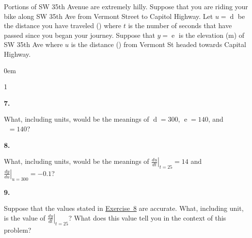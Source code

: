 \documentclass[12pt,]{book}
\theoremstyle{plain}
\theoremstyle{definition}
\numberwithin{equation}{section}
\newenvironment{exercisegroup}%
{\medskip\noindent}%
{\par\bigskip}%
\newlength{\exercisegroupindent}%
\newlength{\exercisegroupitemwidth}%
\newenvironment{exercisegrouplist}%
{\vspace{-\partopsep}%
\begin{adjustwidth}{\exercisegroupindent}{0em}}%
{\end{adjustwidth}%
\vspace{-\partopsep}%
\vspace{\baselineskip}}%
\newenvironment{exercisegroupbycol}[1]%
{\begin{exercisegrouplist}%
\vspace{-\multicolsep}%
\begin{multicols}{#1}%
\setlength{\parindent}{0em}%
\setlength{\exercisegroupitemwidth}{\linewidth}}%
{\end{multicols}%
\vspace{-\multicolsep}%
\end{exercisegrouplist}}%
\newenvironment{exercisegroupitem}[1]%
{\begin{minipage}[t]{\exercisegroupitemwidth}
\vspace{0pt}%
{\bfseries#1}%
\rule{0pt}{\baselineskip}}{\strut%
\end{minipage}%
\hspace{\columnsep}}%
\providecommand\phantomsection{}
\newcommand{\fe}[2]{\mathop{{#1}{\left(#2\right)}}}
\newcommand{\lzoa}[3]{\left.{\frac{d#1}{d#2}}\right|_{#3}}
\begin{document}
\begin{exercisegroup}%
Portions of SW 35th Avenue are extremely hilly.  Suppose that you are riding your bike along SW 35th Ave from Vermont Street to Capitol Highway.  Let \(u=\fe{d}{t}\) be the distance you have traveled (\si{\foot}) where \(t\) is the number of seconds that have passed since you began your journey.  Suppose that \(y=\fe{e}{u}\) is the elevation (\si{\meter}) of SW 35th Ave where \(u\) is the distance (\si{\foot}) from Vermont St headed towards Capital Highway.%
\par
\begin{exercisegroupbycol}{1}%
\begin{exercisegroupitem}{7. }\phantomsection\hypertarget{exercise-371}{\null}
What, including units, would be the meanings of \(\fe{d}{25}=300\), \(\fe{e}{300}=140\), and \(\fe{\left(e\circ d\right)}{25}=140\)?%
\end{exercisegroupitem}%
\par%
\begin{exercisegroupitem}{8. }\phantomsection\hypertarget{exercise-leibniz-chain-rule}{\null}
What, including units, would be the meanings of \(\lzoa{u}{t}{t=25}=14\) and \(\lzoa{y}{u}{u=300}=-0.1\)?%
\end{exercisegroupitem}%
\par%
\begin{exercisegroupitem}{9. }\phantomsection\hypertarget{exercise-373}{\null}
Suppose that the values stated in \hyperref[exercise-leibniz-chain-rule]{Exercise~8} are accurate. What, including unit, is the value of \(\lzoa{y}{t}{t=25}\)? What does this value tell you in the context of this problem?%
\end{exercisegroupitem}%
\par%
\end{exercisegroupbycol}%
\end{exercisegroup}%
\end{document}
